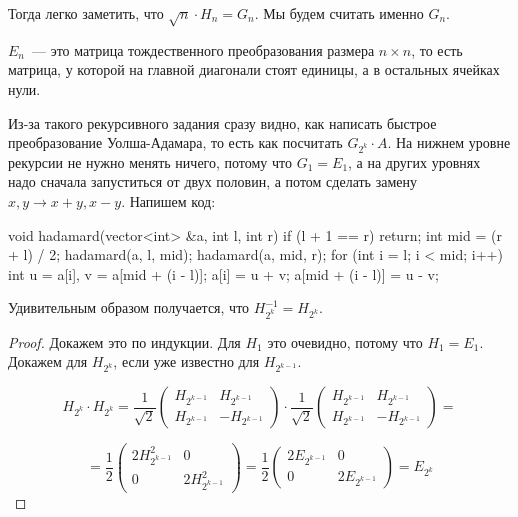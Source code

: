 Тогда легко заметить, что $\sqrt{n} \cdot H_n = G_n$. Мы будем считать именно $G_n$.

\begin{designation}
    $E_n$~--- это матрица тождественного преобразования размера $n \times n$, то есть матрица,
    у которой на главной диагонали стоят единицы, а в остальных ячейках нули.
\end{designation}

Из-за такого рекурсивного задания сразу видно, как написать быстрое преобразование Уолша-Адамара,
то есть как посчитать $G_{2^k} \cdot A$.
На нижнем уровне рекурсии не нужно менять ничего, потому что $G_1 = E_1$,
а на других уровнях надо сначала запуститься от двух половин, а потом сделать замену
$x, y \to x + y, x - y$. Напишем код:

\begin{code}
void hadamard(vector<int> &a, int l, int r) {
    if (l + 1 == r) {
        return;
    }
    int mid = (r + l) / 2;
    hadamard(a, l, mid);
    hadamard(a, mid, r);
    for (int i = l; i < mid; i++) {
        int u = a[i], v = a[mid + (i - l)];
        a[i] = u + v;
        a[mid + (i - l)] = u - v;
    }
}
\end{code}

\begin{lemma}    
Удивительным образом получается, что $H_{2^k}^{-1} = H_{2^k}$.
\end{lemma}

\begin{proof}
    Докажем это по индукции.
    Для $H_1$ это очевидно, потому что $H_1 = E_1$.
    Докажем для $H_{2^k}$, если уже известно для $H_{2^{k - 1}}$.

    $$H_{2^k} \cdot H_{2^k} = 
\frac{1}{\sqrt{2}}
\begin{pmatrix}
    H_{2^{k - 1}} & H_{2^{k - 1}}\\
    H_{2^{k - 1}} & -H_{2^{k - 1}}
\end{pmatrix}
\cdot
\frac{1}{\sqrt{2}}
\begin{pmatrix}
    H_{2^{k - 1}} & H_{2^{k - 1}}\\
    H_{2^{k - 1}} & -H_{2^{k - 1}}
\end{pmatrix}
=$$

$$ = \frac{1}{2}
\begin{pmatrix}
    2H_{2^{k - 1}}^2 & 0\\
    0 & 2H_{2^{k - 1}}^2
\end{pmatrix}
=
\frac{1}{2}
\begin{pmatrix}
    2E_{2^{k - 1}} & 0\\
    0 & 2E_{2^{k - 1}}
\end{pmatrix} = E_{2^k}
$$
\end{proof}

